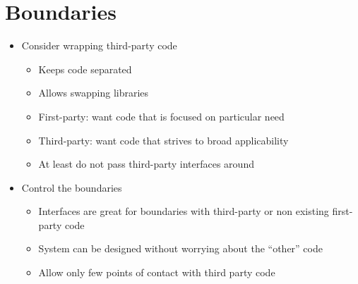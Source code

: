 \section{Boundaries}
\begin{itemize}
    \item Consider wrapping third-party code
    \begin{itemize}
        \item Keeps code separated
        \item Allows swapping libraries
        \item First-party: want code that is focused on particular need
        \item Third-party: want code that strives to broad applicability
        \item At least do not pass third-party interfaces around
    \end{itemize}
    \item Control the boundaries
    \begin{itemize}
        \item Interfaces are great for boundaries with third-party or non existing first-party code
        \item System can be designed without worrying about the ``other'' code
        \item Allow only few points of contact with third party code
    \end{itemize}
\end{itemize}
